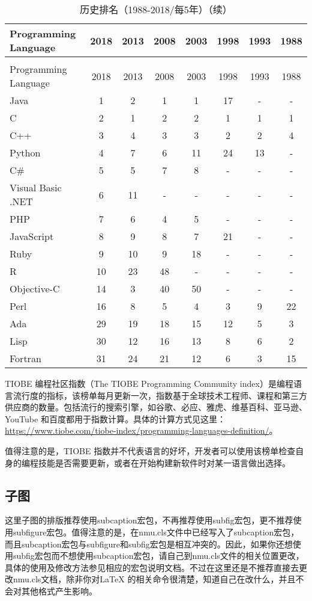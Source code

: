 \begin{longtabu}{lccccccc}
	\caption{历史排名（1988-2018/每5年）}\label{tab:tabu_test_4}\\
	\toprule
	Programming Language	&	2018	&	2013	&	2008	&	2003	&	1998	&	1993	&	1988	\\	
	\midrule%
	\endfirsthead
	\caption{历史排名（1988-2018/每5年）（续）}\\
	\toprule
	Programming Language	&	2018	&	2013	&	2008	&	2003	&	1998	&	1993	&	1988	\\
	\midrule%
	\endhead
	\bottomrule%
	\endfoot
	Java	&	1	&	2	&	1	&	1	&	17	&	-	&	-	\\
	C	&	2	&	1	&	2	&	2	&	1	&	1	&	1	\\
	C++	&	3	&	4	&	3	&	3	&	2	&	2	&	4	\\
	Python	&	4	&	7	&	6	&	11	&	24	&	13	&	-	\\
	C$\#$	&	5	&	5	&	7	&	8	&	-	&	-	&	-	\\
	Visual Basic .NET	&	6	&	11	&	-	&	-	&	-	&	-	&	-	\\
	PHP	&	7	&	6	&	4	&	5	&	-	&	-	&	-	\\
	JavaScript	&	8	&	9	&	8	&	7	&	21	&	-	&	-	\\
	Ruby	&	9	&	10	&	9	&	18	&	-	&	-	&	-	\\
	R	&	10	&	23	&	48	&	-	&	-	&	-	&	-	\\
	Objective-C	&	14	&	3	&	40	&	50	&	-	&	-	&	-	\\
	Perl	&	16	&	8	&	5	&	4	&	3	&	9	&	22	\\
	Ada	&	29	&	19	&	18	&	15	&	12	&	5	&	3	\\
	Lisp	&	30	&	12	&	16	&	13	&	8	&	6	&	2	\\
	Fortran	&	31	&	24	&	21	&	12	&	6	&	3	&	15	\\
\end{longtabu}
TIOBE 编程社区指数（The TIOBE Programming Community index）是编程语言流行度的指标，该榜单每月更新一次，指数基于全球技术工程师、课程和第三方供应商的数量。包括流行的搜索引擎，如谷歌、必应、雅虎、维基百科、亚马逊、YouTube 和百度都用于指数计算。具体的计算方式见这里：\href{https://www.tiobe.com/tiobe-index/programming-languages-definition/}{https://www.tiobe.com/tiobe-index/programming-languages-definition/}。

值得注意的是，TIOBE 指数并不代表语言的好坏，开发者可以使用该榜单检查自身的编程技能是否需要更新，或者在开始构建新软件时对某一语言做出选择。
\subsection{子图}
这里子图的排版推荐使用subcaption宏包，不再推荐使用subfig宏包，更不推荐使用subfigure宏包。值得注意的是，在nmu.cls文件中已经写入了subcaption宏包，而且subcaption宏包与subfigure和subfig宏包是相互冲突的。因此，如果你还想使用subfig宏包而不想使用subcaption宏包，请自己到nmu.cls文件的相关位置更改，具体的使用及修改方法参见相应的宏包说明文档。不过在这里还是不推荐直接去更改nmu.cls文档，除非你对\LaTeX{} 的相关命令很清楚，知道自己在改什么，并且不会对其他格式产生影响。

